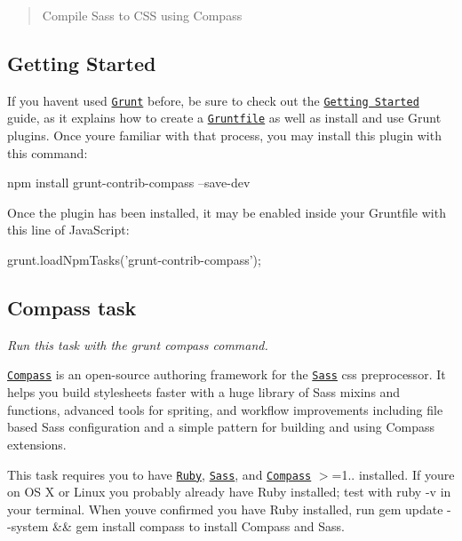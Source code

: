 \begin{quote}
Compile Sass to C\+SS using Compass \end{quote}


\subsection*{Getting Started}

If you haven\textquotesingle{}t used \href{http://gruntjs.com/}{\tt Grunt} before, be sure to check out the \href{http://gruntjs.com/getting-started}{\tt Getting Started} guide, as it explains how to create a \href{http://gruntjs.com/sample-gruntfile}{\tt Gruntfile} as well as install and use Grunt plugins. Once you\textquotesingle{}re familiar with that process, you may install this plugin with this command\+:


\begin{DoxyCode}
npm install grunt-contrib-compass --save-dev
\end{DoxyCode}


Once the plugin has been installed, it may be enabled inside your Gruntfile with this line of Java\+Script\+:


\begin{DoxyCode}
grunt.loadNpmTasks('grunt-contrib-compass');
\end{DoxyCode}


\subsection*{Compass task}

{\itshape Run this task with the {\ttfamily grunt compass} command.}

\href{http://compass-style.org/}{\tt Compass} is an open-\/source authoring framework for the \href{http://sass-lang.com/}{\tt Sass} css preprocessor. It helps you build stylesheets faster with a huge library of Sass mixins and functions, advanced tools for spriting, and workflow improvements including file based Sass configuration and a simple pattern for building and using Compass extensions.

This task requires you to have \href{http://www.ruby-lang.org/en/downloads/}{\tt Ruby}, \href{http://sass-lang.com/tutorial.html}{\tt Sass}, and \href{http://compass-style.org/install/}{\tt Compass} $>$=1.. installed. If you\textquotesingle{}re on OS X or Linux you probably already have Ruby installed; test with {\ttfamily ruby -\/v} in your terminal. When you\textquotesingle{}ve confirmed you have Ruby installed, run {\ttfamily gem update -\/-\/system \&\& gem install compass} to install Compass and Sass.

